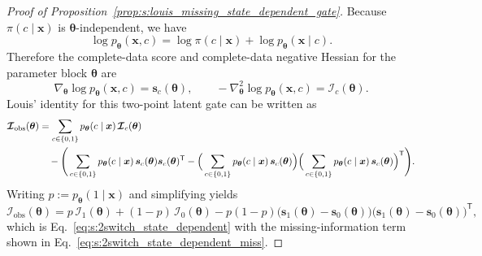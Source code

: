 \documentclass[10pt,a4paper]{amsart}
\newcommand{\Io}{\bm{\mathcal{I}}_{\mathrm{obs}}}
\begin{document}
\begin{proof}[Proof of Proposition~\ref{prop:s:louis_missing_state_dependent_gate}]
Because $\pi(c\mid \bm x)$ is $\bm\theta$-independent, we have
\begin{equation}
\log p_{\bm\theta}(\bm x,c)=\log \pi(c\mid \bm x)+\log p_{\bm\theta}(\bm x\mid c).
\end{equation}
Therefore the complete-data score and complete-data negative Hessian for the parameter block $\bm\theta$ are
\begin{equation}
\nabla_{\bm\theta}\log p_{\bm\theta}(\bm x,c)=\bm s_c(\bm\theta),
\qquad
-\nabla_{\bm\theta}^2\log p_{\bm\theta}(\bm x,c)=\bm{\mathcal I}_c(\bm\theta).
\end{equation}
Louis' identity for this two-point latent gate can be written as
\begin{align}
\Io(\bm\theta)
&=\sum_{c\in\{0,1\}}p_{\bm\theta}(c\mid \bm x)\,\bm{\mathcal I}_c(\bm\theta)\notag\\
&\quad-\Bigg(
\sum_{c\in\{0,1\}}p_{\bm\theta}(c\mid \bm x)\,\bm s_c(\bm\theta)\bm s_c(\bm\theta)^{\mathsf T}
-\Big(\sum_{c\in\{0,1\}}p_{\bm\theta}(c\mid \bm x)\,\bm s_c(\bm\theta)\Big)\Big(\sum_{c\in\{0,1\}}p_{\bm\theta}(c\mid \bm x)\,\bm s_c(\bm\theta)\Big)^{\mathsf T}
\Bigg).
\end{align}
Writing $p:=p_{\bm\theta}(1\mid \bm x)$ and simplifying yields
\begin{equation}
\Io(\bm\theta)=p\,\bm{\mathcal I}_1(\bm\theta)+(1-p)\,\bm{\mathcal I}_0(\bm\theta)
-p(1-p)\big(\bm s_1(\bm\theta)-\bm s_0(\bm\theta)\big)\big(\bm s_1(\bm\theta)-\bm s_0(\bm\theta)\big)^{\mathsf T},
\end{equation}
which is Eq.~\eqref{eq:s:2switch_state_dependent} with the missing-information term shown in Eq.~\eqref{eq:s:2switch_state_dependent_miss}.
\end{proof}
\end{document}
